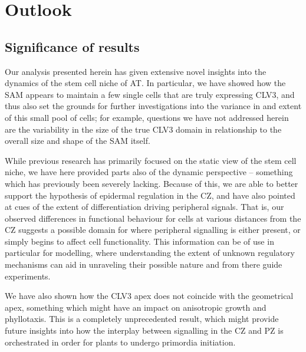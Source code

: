 \chapter{Outlook}

\ifpdf
\graphicspath{{Chapter5/Figs/Raster/}{Chapter5/Figs/PDF/}{Chapter5/Figs/}}
\else
\graphicspath{{Chapter5/Figs/Vector/}{Chapter5/Figs/}}
\fi

\section{Significance of results}
Our analysis presented herein has given extensive novel insights into the dynamics of
the stem cell niche of AT. In particular, we have showed how the SAM appears to
maintain a few single cells that are truly expressing CLV3, and thus also set
the grounds for further investigations into the variance in and extent of this small
pool of cells; for example, questions we have not addressed herein are the
variability in the size of the true CLV3 domain in relationship to the overall
size and shape of the SAM itself. 

While previous research has primarily focused on the static view of the stem
cell niche, we have here provided parts also of the dynamic perspective --
something which has previously been severely lacking. Because of this, we are
able to better support the hypothesis of epidermal regulation in the
CZ, and have also pointed at cues of the extent of differentiation driving peripheral
signals. That is, our observed differences in functional behaviour for cells at
various distances from the CZ suggests a possible domain for where peripheral
signalling is either present, or simply begins to affect cell functionality.
This information can be of use in particular for modelling, where
understanding the extent of unknown regulatory mechanisms can aid in unraveling
their possible nature and from there guide experiments.

% 
We have also shown how the CLV3 apex does not coincide with the geometrical
apex, something which might have an impact on anisotropic growth and
phyllotaxis. This is a completely unprecedented result, which might provide
future insights into how the interplay between signalling in the CZ and PZ is orchestrated
in order for plants to undergo primordia initiation.


